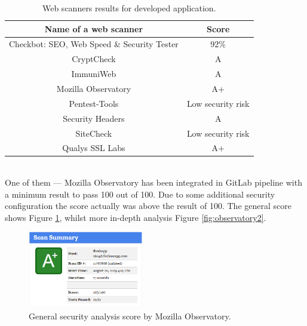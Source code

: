 \documentclass{article} %
\begin{document}
\begin{table}[ht]
\centering
    \begin{tabular}{ | c | c |}
    \hline
    \multicolumn{1}{|c|}{\textbf{Name of a web scanner}} & \multicolumn{1}{c|}{\textbf{Score}} \\ \hline
    Checkbot: SEO, Web Speed\index{Checkbot: SEO, Web Speed \& Security Tester} \& Security Tester & 92\% \\ \hline
    CryptCheck\index{CryptCheck} & A \\ \hline
    ImmuniWeb\index{ImmuniWeb} & A \\ \hline
    Mozilla Observatory\index{Mozilla!Observatory} & A+ \\ \hline
    Pentest-Tools\index{Pentest-Tools} & Low security risk \\ \hline
    Security Headers\index{Security!Headers} & A \\ \hline
    SiteCheck\index{SiteCheck} & Low security risk \\ \hline
    Qualys SSL Labs\index{Qualys SSL Labs} & A+ \\ \hline
    \end{tabular}
\caption{Web scanners results for developed application.}
\label{tab:web_scanners}
\end{table}\\
One of them --- Mozilla Observatory has been integrated in GitLab pipeline with a minimum result to pass 100 out of 100. Due to some additional security configuration the score actually was above the result of 100. The general score shows Figure \ref{fig:observatory1}, whilst more in-depth analysis Figure \ref{fig:observatory2}.
\begin{figure}[ht]
  \centering
      \includegraphics[width=0.45\textwidth]{observatory1.png}
  \caption{General security analysis score by Mozilla Observatory.}
  \label{fig:observatory1}
\end{figure}
\end{document}

